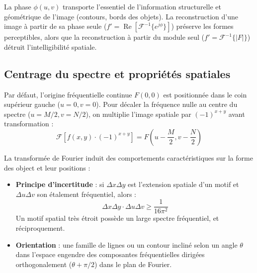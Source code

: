 La phase $\phi(u,v)$ transporte l'essentiel de l'information structurelle et géométrique de l'image (contours, bords des objets). La reconstruction d'une image à partir de sa phase seule ($f' = \operatorname{Re}[\mathcal{F}^{-1}\{e^{j \phi}\}]$) préserve les formes perceptibles, alors que la reconstruction à partir du module seul ($f' = \mathcal{F}^{-1}\{|F|\}$) détruit l'intelligibilité spatiale.

\subsection{Centrage du spectre et propriétés spatiales}

\begin{proposition}
    Par défaut, l'origine fréquentielle continue $F(0,0)$ est positionnée dans le coin supérieur gauche ($u=0, v=0$).
    Pour décaler la fréquence nulle au centre du spectre ($u = M/2, v = N/2$), on multiplie l'image spatiale par $(-1)^{x+y}$ avant transformation :
    \begin{equation}
        \mathcal{F}\left[ f(x,y) \cdot (-1)^{x+y} \right] = F\left(u - \frac{M}{2}, v - \frac{N}{2}\right)
    \end{equation}
\end{proposition}

\begin{proposition}
    La transformée de Fourier induit des comportements caractéristiques sur la forme des object et leur positions : 
    \begin{itemize}
        \item \textbf{Principe d'incertitude} : si $\Delta x \Delta y$ est l'extension spatiale d'un motif et $\Delta u \Delta v$ son étalement fréquentiel, alors :
            \begin{equation}
                \Delta x \Delta y \cdot \Delta u \Delta v \geqslant \frac{1}{16\pi^2}
            \end{equation}
            Un motif spatial très étroit possède un large spectre fréquentiel, et réciproquement.
        \item \textbf{Orientation} : une famille de lignes ou un contour incliné selon un angle $\theta$ dans l'espace engendre des composantes fréquentielles dirigées orthogonalement ($\theta + \pi/2$) dans le plan de Fourier.
    \end{itemize}
\end{proposition}

